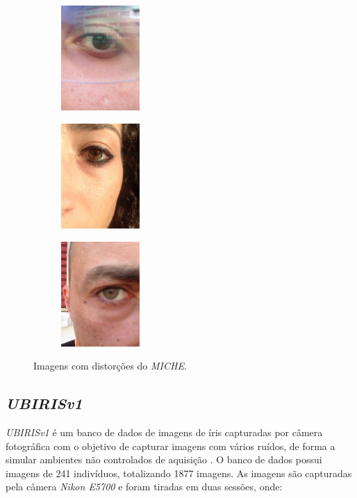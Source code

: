 \begin{figure}[h!]
\begin{subfigure}{.3\textwidth}
\centering
\includegraphics[width=3cm,height=4cm]{img/Resultados/miche/oculos.jpg}
\end{subfigure}\hfill
\begin{subfigure}{.3\textwidth}
\centering
\includegraphics[width=3cm,height=4cm]{img/Resultados/miche/cabelo.jpg}
\end{subfigure}\hfill
\begin{subfigure}{.3\textwidth}
\centering
\includegraphics[width=3cm,height=4cm]{img/Resultados/miche/ruidosa_funda.jpg}
\end{subfigure}
\caption{Imagens com distorções do \textit{MICHE}.}
\label{fig:experimentos:miche_ruim}
\end{figure}

\FloatBarrier

\subsection{\textit{UBIRISv1}}\label{sec:experimentos:db:ubirisv1}

\par \textit{UBIRISv1} é um banco de dados de imagens de íris capturadas por câmera fotográfica com o objetivo de capturar imagens com vários ruídos, de forma a simular ambientes não controlados de aquisição \cite{proenca2005-ubirisv1, ubirisv1}. O banco de dados possui imagens de 241 indivíduos, totalizando 1877 imagens. As imagens são capturadas pela câmera \textit{Nikon E5700} e foram tiradas em duas sessões, onde:

